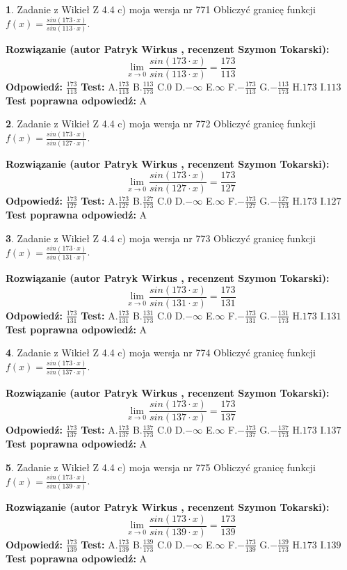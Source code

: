 \documentclass[12pt, a4paper]{article}
\theoremstyle{definition} %
\newtheorem{zad}{}
\newcommand{\zadStart}[1]{\begin{zad}#1\newline}
\newcommand{\zadStop}{\end{zad}}
\newcommand{\rozwStart}[2]{\noindent \textbf{Rozwiązanie (autor #1 , recenzent #2): }\newline}
\newcommand{\rozwStop}{\newline}
\newcommand{\odpStart}{\noindent \textbf{Odpowiedź:}\newline}
\newcommand{\odpStop}{\newline}
\newcommand{\testStart}{\noindent \textbf{Test:}\newline}
\newcommand{\testStop}{\newline}
\newcommand{\kluczStart}{\noindent \textbf{Test poprawna odpowiedź:}\newline}
\newcommand{\kluczStop}{\newline}
\begin{document}
\zadStart{Zadanie z Wikieł Z 4.4 c) moja wersja nr 771}
Obliczyć granicę funkcji $f(x)=\frac{sin(173\cdot x)}{sin(113\cdot x)}$.
\zadStop
\rozwStart{Patryk Wirkus}{Szymon Tokarski}
$$\lim\limits_{x\to 0}\frac{sin(173\cdot x)}{sin(113\cdot x)}=
\frac{173}{113}$$
\rozwStop
\odpStart
$\frac{173}{113}$
\odpStop
\testStart
A.$\frac{173}{113}$
B.$\frac{113}{173}$
C.$0$
D.$-\infty$
E.$\infty$
F.$-\frac{173}{113}$
G.$-\frac{113}{173}$
H.$173$
I.$113$
\testStop
\kluczStart
A
\kluczStop



\zadStart{Zadanie z Wikieł Z 4.4 c) moja wersja nr 772}
Obliczyć granicę funkcji $f(x)=\frac{sin(173\cdot x)}{sin(127\cdot x)}$.
\zadStop
\rozwStart{Patryk Wirkus}{Szymon Tokarski}
$$\lim\limits_{x\to 0}\frac{sin(173\cdot x)}{sin(127\cdot x)}=
\frac{173}{127}$$
\rozwStop
\odpStart
$\frac{173}{127}$
\odpStop
\testStart
A.$\frac{173}{127}$
B.$\frac{127}{173}$
C.$0$
D.$-\infty$
E.$\infty$
F.$-\frac{173}{127}$
G.$-\frac{127}{173}$
H.$173$
I.$127$
\testStop
\kluczStart
A
\kluczStop



\zadStart{Zadanie z Wikieł Z 4.4 c) moja wersja nr 773}
Obliczyć granicę funkcji $f(x)=\frac{sin(173\cdot x)}{sin(131\cdot x)}$.
\zadStop
\rozwStart{Patryk Wirkus}{Szymon Tokarski}
$$\lim\limits_{x\to 0}\frac{sin(173\cdot x)}{sin(131\cdot x)}=
\frac{173}{131}$$
\rozwStop
\odpStart
$\frac{173}{131}$
\odpStop
\testStart
A.$\frac{173}{131}$
B.$\frac{131}{173}$
C.$0$
D.$-\infty$
E.$\infty$
F.$-\frac{173}{131}$
G.$-\frac{131}{173}$
H.$173$
I.$131$
\testStop
\kluczStart
A
\kluczStop



\zadStart{Zadanie z Wikieł Z 4.4 c) moja wersja nr 774}
Obliczyć granicę funkcji $f(x)=\frac{sin(173\cdot x)}{sin(137\cdot x)}$.
\zadStop
\rozwStart{Patryk Wirkus}{Szymon Tokarski}
$$\lim\limits_{x\to 0}\frac{sin(173\cdot x)}{sin(137\cdot x)}=
\frac{173}{137}$$
\rozwStop
\odpStart
$\frac{173}{137}$
\odpStop
\testStart
A.$\frac{173}{137}$
B.$\frac{137}{173}$
C.$0$
D.$-\infty$
E.$\infty$
F.$-\frac{173}{137}$
G.$-\frac{137}{173}$
H.$173$
I.$137$
\testStop
\kluczStart
A
\kluczStop



\zadStart{Zadanie z Wikieł Z 4.4 c) moja wersja nr 775}
Obliczyć granicę funkcji $f(x)=\frac{sin(173\cdot x)}{sin(139\cdot x)}$.
\zadStop
\rozwStart{Patryk Wirkus}{Szymon Tokarski}
$$\lim\limits_{x\to 0}\frac{sin(173\cdot x)}{sin(139\cdot x)}=
\frac{173}{139}$$
\rozwStop
\odpStart
$\frac{173}{139}$
\odpStop
\testStart
A.$\frac{173}{139}$
B.$\frac{139}{173}$
C.$0$
D.$-\infty$
E.$\infty$
F.$-\frac{173}{139}$
G.$-\frac{139}{173}$
H.$173$
I.$139$
\testStop
\kluczStart
A
\kluczStop
\end{document}
